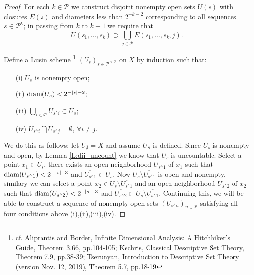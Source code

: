 \begin{proof}
For each $k\in\mathcal{P}$ we construct disjoint nonempty open sets
$U(s)$ with closures $E(s)$ and diameters less than $2^{-k-2}$ corresponding to
all sequences $s\in\mathcal{P}^k$; in passing from $k$ to $k+1$ we require that 
\[
	U(s_1,\dots,s_k) \supset \bigcup_{j\in\mathcal{P}} E(s_1,\dots,s_k,j).
\]


Define a Lusin scheme 
\footnote{cf. Aliprantis and Border, Infinite Dimensional Analysis: A 
  Hitchhiker's Guide, Theorem 3.66, pp.104-105;
  Kechris, Classical Descriptive Set Theory, Theorem 7.9, pp.38-39;
  Tserunyan, Introduction to Descriptive Set Theory (version Nov. 12, 2019), 
  Theorem 5.7, pp.18-19
}
$(U_s)_{s\in \mathcal{P}^{<\mathcal{P}}}$ on $X$ by 
induction such that:
\begin{enumerate}
  \item[(i)] $U_s$ is nonempty open;
  \item[(ii)] $\operatorname*{diam}(U_s)<2^{-|s|-2}$;
  \item[(iii)] $\bigcup_{i\in\mathcal{P}} \overline{U_{s^\wedge i}}
                \subset U_s$;
  \item[(iv)] $U_{s^\wedge i}\bigcap U_{s^\wedge j}=\emptyset$, 
              $\forall i\neq j$.
\end{enumerate}
We do this as follows: let $U_{\emptyset}=X$ and assume $U_S$ is defined. Since
$U_s$ is nonempty and open, by Lemma \ref{L:dii_uncount} we know that $U_s$ is
uncountable. Select a point $x_1\in U_s$, there exists an open neighborhood 
$U_{s^\wedge 1}$ of $x_1$ such that $\operatorname*{diam}(U_{s^\wedge 1})<2^{-|s|-3}$ and 
$\overline{U_{s^\wedge 1}}\subset U_s$. 
Now $U_s\setminus \overline{U_{s^\wedge 1}}$ is open and nonempty, similary we
can select a point $x_2\in U_s\setminus \overline{U_{s^\wedge 1}}$ and an open
neighborhood $U_{s^\wedge 2}$ of $x_2$ such that 
$\operatorname*{diam}(U_{s^\wedge 2})<2^{-|s|-3}$ and 
$\overline{U_{s^\wedge 2}}\subset U_s\setminus\overline{U_{s^\wedge 1}}$. 
Continuing this, we will be able to construct a sequence of nonempty open sets
$(U_{s^\wedge n})_{n\in\mathcal{P}}$ satisfying all four conditions above
(i),(ii),(iii),(iv).


\end{proof}

